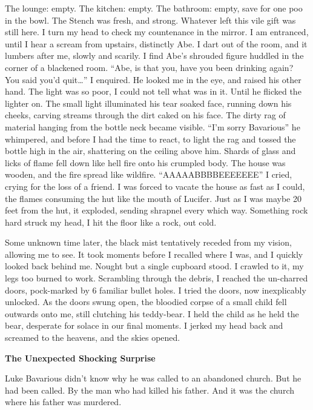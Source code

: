 The lounge: empty. The kitchen: empty. The bathroom: empty, save
for one poo in the bowl. The Stench was fresh, and strong. Whatever
left this vile gift was still here. I turn my head to check my
countenance in the mirror. I am entranced, until I hear a scream
from upstairs, distinctly Abe. I dart out of the room, and it
lumbers after me, slowly and scarily. I find Abe's shrouded
figure huddled in the corner of a blackened room. ``Abe, is
that you, have you been drinking again? You said you'd
quit{\ldots}'' I enquired. He looked me in the eye, and raised his
other hand. The light was so poor, I could not tell what was in it.
Until he flicked the lighter on. The small light illuminated his
tear soaked face, running down his cheeks, carving streams through
the dirt caked on his face. The dirty rag of material hanging from
the bottle neck became visible. ``I'm sorry
Bavarious'' he whimpered, and before I had the time to react,
to light the rag and tossed the bottle high in the air, shattering
on the ceiling above him. Shards of glass and licks of flame fell
down like hell fire onto his crumpled body. The house was wooden,
and the fire spread like wildfire. ``AAAAABBBBEEEEEEE'' I
cried, crying for the loss of a friend. I was forced to vacate the
house as fast as I could, the flames consuming the hut like the
mouth of Lucifer. Just as I was maybe 20 feet from the hut, it
exploded, sending shrapnel every which way. Something rock hard
struck my head, I hit the floor like a rock, out cold.



Some unknown time later, the black mist tentatively receded from my
vision, allowing me to see. It took moments before I recalled where
I was, and I quickly looked back behind me. Nought but a single
cupboard stood. I crawled to it, my legs too burned to work.
Scrambling through the debris, I reached the un-charred doors,
pock-marked by 6 familiar bullet holes. I tried the doors, now
inexplicably unlocked. As the doors swung open, the bloodied corpse
of a small child fell outwards onto me, still clutching his
teddy-bear. I held the child as he held the bear, desperate for
solace in our final moments. I jerked my head back and screamed to
the heavens, and the skies opened. 
 





{\bf The Unexpected Shocking Surprise}



Luke Bavarious didn't know why he was called to an abandoned
church. But he had been called. By the man who had killed his
father. And it was the church where his father was murdered.




